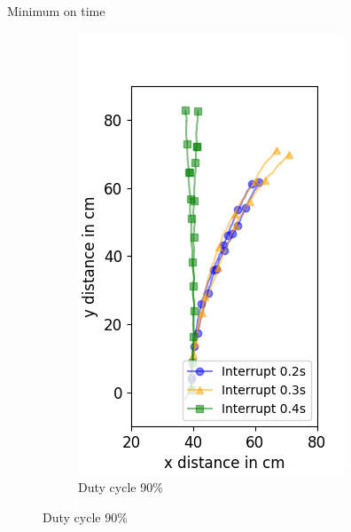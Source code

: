 \documentclass{beamer}
\begin{document}
\begin{frame}{Minimum on time}
\begin{figure}
\begin{subfigure}[b]{0.32\textwidth}
			\includegraphics[width=\textwidth]{pics/figure_90.png}
			\caption*{Duty cycle 90\%}
		\end{subfigure}
	\end{figure}
\end{frame}
\end{document}
